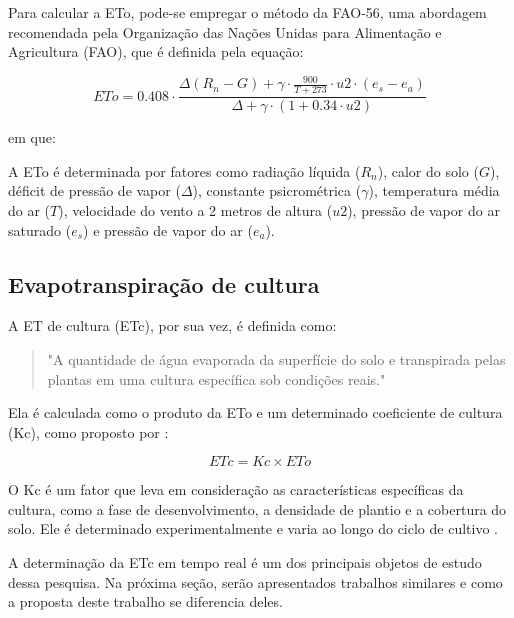 Para calcular a ETo, pode-se empregar o método da FAO-56, uma abordagem recomendada pela Organização das Nações Unidas para Alimentação e Agricultura (FAO), que é definida pela equação:

\begin{equation}
ETo = 0.408 \cdot \frac{\Delta (R_n - G) + \gamma \cdot \frac{900}{T + 273} \cdot u2 \cdot (e_s - e_a)}{\Delta + \gamma \cdot (1 + 0.34 \cdot u2)}
\end{equation}

em que: 

A ETo é determinada por fatores como radiação líquida ($R_n$), calor do solo ($G$), déficit de pressão de vapor ($\Delta$), constante psicrométrica ($\gamma$), temperatura média do ar ($T$), velocidade do vento a 2 metros de altura ($u2$), pressão de vapor do ar saturado ($e_s$) e pressão de vapor do ar ($e_a$).

\subsection{Evapotranspiração de cultura}

A ET de cultura (ETc), por sua vez, é definida como:

\begin{quote}
  "A quantidade de água evaporada da superfície do solo e transpirada pelas plantas em uma cultura específica sob condições reais." \parencite{bernardo_irrigacao2008}
\end{quote}

Ela é calculada como o produto da ETo e um determinado coeficiente de cultura (Kc), como proposto por \textcite{bernardo_irrigacao2008}:

\begin{equation}
ETc = Kc \times ETo
\end{equation}

O Kc é um fator que leva em consideração as características específicas da cultura, como a fase de desenvolvimento, a densidade de plantio e a cobertura do solo. Ele é determinado experimentalmente e varia ao longo do ciclo de cultivo \parencite{bernardo_irrigacao2008}.

A determinação da ETc em tempo real é um dos principais objetos de estudo dessa pesquisa. Na próxima seção, serão apresentados trabalhos similares e como a proposta deste trabalho se diferencia deles.